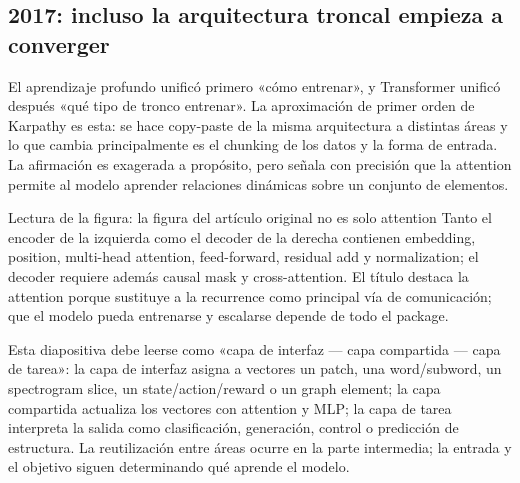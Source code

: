 \subsection{2017: incluso la arquitectura troncal empieza a converger}

El aprendizaje profundo unificó primero «cómo entrenar», y Transformer unificó después «qué tipo de tronco entrenar». La aproximación de primer orden de Karpathy es esta: se hace copy-paste de la misma arquitectura a distintas áreas y lo que cambia principalmente es el chunking de los datos y la forma de entrada. La afirmación es exagerada a propósito, pero señala con precisión que la attention permite al modelo aprender relaciones dinámicas sobre un conjunto de elementos.


\begin{knowledgebox}{Lectura de la figura: la figura del artículo original no es solo attention}
Tanto el encoder de la izquierda como el decoder de la derecha contienen embedding, position, multi-head attention, feed-forward, residual add y normalization; el decoder requiere además causal mask y cross-attention. El título destaca la attention porque sustituye a la recurrence como principal vía de comunicación; que el modelo pueda entrenarse y escalarse depende de todo el package.
\end{knowledgebox}


Esta diapositiva debe leerse como «capa de interfaz — capa compartida — capa de tarea»: la capa de interfaz asigna a vectores un patch, una word/subword, un spectrogram slice, un state/action/reward o un graph element; la capa compartida actualiza los vectores con attention y MLP; la capa de tarea interpreta la salida como clasificación, generación, control o predicción de estructura. La reutilización entre áreas ocurre en la parte intermedia; la entrada y el objetivo siguen determinando qué aprende el modelo.



